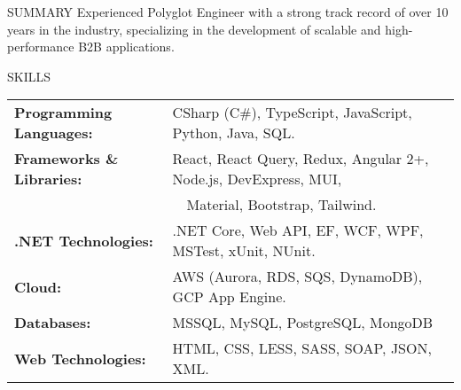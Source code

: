 \documentclass{basecv}
\begin{document}
\begin{rSection}{SUMMARY}
    {Experienced Polyglot Engineer with a strong track record of over 10 years in the industry, specializing in the development of scalable and high-performance B2B applications.}
\end{rSection}

\begin{rSection}{SKILLS}
    \begin{tabular}{ @{} >{\bfseries}l @{\hspace{6ex}} l }
        Programming Languages:   & CSharp (C\#), TypeScript, JavaScript, Python, Java, SQL.         \\
        Frameworks \& Libraries: & React, React Query, Redux, Angular 2+, Node.js, DevExpress, MUI, \\
                                 & \ \ Material, Bootstrap, Tailwind.                               \\
        .NET Technologies:       & .NET Core, Web API, EF, WCF, WPF, MSTest, xUnit, NUnit.          \\
        Cloud:                   & AWS (Aurora, RDS, SQS, DynamoDB), GCP App Engine.                \\
        Databases:               & MSSQL, MySQL, PostgreSQL, MongoDB                                \\
        Web Technologies:        & HTML, CSS, LESS, SASS, SOAP, JSON, XML.                          \\
    \end{tabular}\\
\end{rSection}
\end{document}
